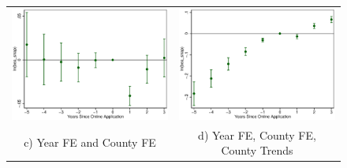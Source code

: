 \documentclass[11pt,letterpaper]{article}
\begin{document}
\begin{figure}
\begin{tabular}{cc}
\includegraphics[scale=0.57]{tabfig/evstu_bea_snap_total_pop_yrcf_5_3}&\includegraphics[scale=0.57]{tabfig/evstu_bea_snap_total_pop_yrcfsttr_5_3}\\
c) Year FE and County FE&d) Year FE, County FE, County Trends\\
\end{tabular}
\end{figure}
\end{document}
